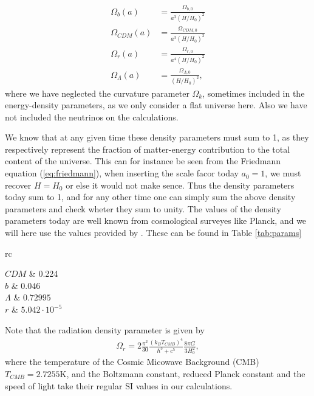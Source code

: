\documentclass[twocolumn]{aastex62}
\begin{document}
\begin{align}
    \Omega_b(a) &= \frac{\Omega_{b,0}}{a^3 (H/H_0)^2}\\
    \Omega_{CDM}(a) &= \frac{\Omega_{CDM,0}}{a^3 (H/H_0)^2}\\
    \Omega_r(a) &= \frac{\Omega_{r,0}}{a^4 (H/H_0)^2}\\
    \Omega_\Lambda(a) &= \frac{\Omega_{\Lambda,0}}{(H/H_0)^2},
\end{align}
where we have neglected the curvature parameter $\Omega_k$, sometimes included in
the energy-density parameters, as we only consider a flat universe here. Also we
have not included the neutrinos on the calculations. 

We know that at any given time these density parameters must sum to 1, as they
respectively represent the fraction of matter-energy contribution to the total
content of the universe. This can for instance be seen from the Friedmann
equation (\ref{eq:friedmann}), when inserting the scale facor today $a_0 = 1$,
we must recover $H = H_0$ or else it would not make sence. Thus the density
parameters today sum to 1, and for any other time one can simply sum the above
density parameters and check wheter they sum to unity.
The values of the density parameters today are well known from cosmological
surveyes like Planck, and we will here use the values provided by \cite{callin:2006}. These can be found in Table \ref{tab:params}

\begin{deluxetable}{rc}
	
	\startdata
	$CDM$  &  0.224  \\
	$b$ & $0.046$  \\
	$\Lambda$ & $0.72995$   \\
	$r$ & $5.042\cdot 10^{-5}$  
	\enddata
\end{deluxetable}

Note that the radiation density parameter is given by 
\begin{align}
    \Omega_r = 2\frac{\pi^2}{30} \frac{(k_B T_{CMB})^4}{\hbar^3 + c^5}\frac{8\pi G}{3H_0^2},
\end{align}
where the temperature of the Cosmic Micowave Background (CMB) $T_{CMB} =
2.7255\mathrm{K}$, and the Boltzmann constant, reduced Planck constant and the speed of
light take their regular SI values in our calculations.
\end{document}
